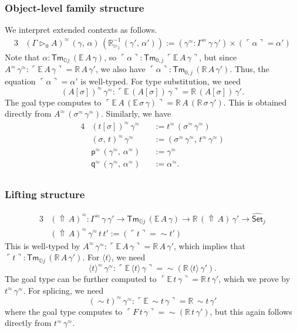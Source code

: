\documentclass[acmsmall]{acmart}
\newcommand{\msf}[1]{\mathsf{#1}}
\newcommand{\mbb}[1]{\mathbb{#1}}
\newcommand{\wh}[1]{\widehat{#1}}
\newcommand{\ext}{\triangleright}
\newcommand{\Lift}{{\Uparrow}}
\newcommand{\spl}{{\sim}}
\newcommand{\qut}[1]{\langle #1\rangle}
\newcommand{\mbbo}{\mbb{O}}
\newcommand{\Tm}{\msf{Tm}}
\newcommand{\p}{\mathsf{p}}
\newcommand{\q}{\mathsf{q}}
\newcommand{\Set}{\mathsf{Set}}
\newcommand{\emb}[1]{\ulcorner#1\urcorner}
\newcommand{\ev}{\mbb{E}}
\newcommand{\re}{\mbb{R}}
\theoremstyle{remark}
\newcommand{\whset}{\wh{\Set}}
\newcommand{\rexti}{\re_{\ext_1}^{-1}}
\newcommand{\rel}{^{\approx}}
\begin{document}
\subsubsection{Object-level family structure} We interpret extended contexts as follows.
\begin{alignat*}{3}
  & (\Gamma \ext_0 A)\rel\,(\gamma,\,\alpha)\,(\rexti\,(\gamma',\,\alpha')) := (\gamma\rel : \Gamma\rel\,\gamma\,\gamma') \times (\emb{\alpha} = \alpha')
\end{alignat*}
Note that $\alpha : \Tm_{\mbbo j}\,(\ev\,A\,\gamma)$, so $\emb{\alpha} :
\Tm_{0,j}\,\emb{\ev\,A\,\gamma}$, but since $A\rel\,\gamma\rel :
\emb{\ev\,A\,\gamma} = \re\,A\,\gamma'$, we also have $\emb{\alpha} :
\Tm_{0,j}\,(\re\,A\,\gamma')$. Thus, the equation $\emb{\alpha} = \alpha'$ is
well-typed. For type substitution, we need
\[
  (A[\sigma])\rel\,\gamma\rel : \emb{\ev\,(A[\sigma])\,\gamma} = \re\,(A[\sigma])\,\gamma'.
\]
The goal type computes to $\emb{\ev\,A\,(\ev\,\sigma\,\gamma)} =
\re\,A\,(\re\,\sigma\,\gamma')$. This is obtained directly from
$A\rel\,(\sigma\rel\,\gamma\rel)$.  Similarly, we have
\begin{alignat*}{4}
  & (t[\sigma])\rel\,\gamma\rel &&:= t\rel\,(\sigma\rel\,\gamma\rel) \\
  & (\sigma,\,t)\rel\,\gamma\rel &&:= (\sigma\rel\,\gamma\rel,\,t\rel\,\gamma\rel) \\
  & \p\rel\,(\gamma\rel,\,\alpha\rel) &&:= \gamma\rel \\
  & \q\rel\,(\gamma\rel,\,\alpha\rel) &&:= \alpha\rel. \\
\end{alignat*}

\subsubsection{Lifting structure}
\begin{alignat*}{3}
  &(\Lift\,A)\rel : \Gamma\rel\,\gamma\,\gamma' \to \Tm_{\mbbo j}\,(\ev\,A\,\gamma) \to \re\,(\Lift\,A)\,\gamma' \to \whset_j\\
  &(\Lift\,A)\rel\,\gamma\rel\,t\,t' := (\emb{t} = \spl t')
\end{alignat*}
This is well-typed by $A\rel\,\gamma\rel : \emb{\ev\,A\,\gamma} = \re\,A\,\gamma'$, which implies
that $\emb{t} : \Tm_{\mbbo j}\,(\re\,A\,\gamma')$. For $\qut{t}$, we need
\[  \qut{t}\rel\,\gamma\rel : \emb{\ev\,\qut{t}\,\gamma} = \spl(\re\,\qut{t}\,\gamma'). \]
The goal type can be further computed to $\emb{\ev\,t\,\gamma} = \re\,t\,\gamma'$, which we prove
by $t\rel\,\gamma\rel$. For splicing, we need
\[
  (\spl t)\rel\,\gamma\rel : \emb{\ev\,\spl t\,\gamma} = \re\,\spl t\,\gamma'
\]
where the goal type computes to $\emb{F\,t\,\gamma} = \spl(\re\,t\,\gamma')$,
but this again follows directly from $t\rel\,\gamma\rel$.
\end{document}
